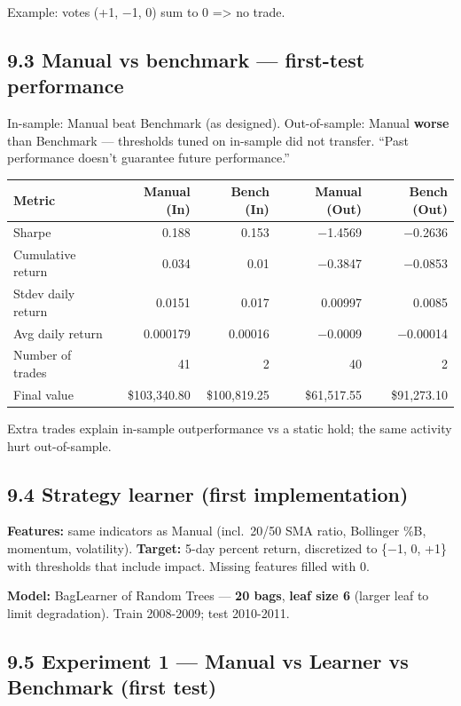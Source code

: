 \documentclass[
  11pt,
]{article}
\begin{document}
Example: votes (+1, −1, 0) sum to 0 =\textgreater{} no trade.

\subsection{9.3 Manual vs benchmark --- first-test
performance}\label{manual-vs-benchmark-first-test-performance}

In-sample: Manual beat Benchmark (as designed). Out-of-sample: Manual
\textbf{worse} than Benchmark --- thresholds tuned on in-sample did not
transfer. ``Past performance doesn't guarantee future performance.''

\begin{longtable}[]{@{}lrrrr@{}}
\toprule\noalign{}
Metric & Manual (In) & Bench (In) & Manual (Out) & Bench (Out) \\
\midrule\noalign{}
\endhead
\bottomrule\noalign{}
\endlastfoot
Sharpe & 0.188 & 0.153 & −1.4569 & −0.2636 \\
Cumulative return & 0.034 & 0.01 & −0.3847 & −0.0853 \\
Stdev daily return & 0.0151 & 0.017 & 0.00997 & 0.0085 \\
Avg daily return & 0.000179 & 0.00016 & −0.0009 & −0.00014 \\
Number of trades & 41 & 2 & 40 & 2 \\
Final value & \$103,340.80 & \$100,819.25 & \$61,517.55 & \$91,273.10 \\
\end{longtable}

Extra trades explain in-sample outperformance vs a static hold; the same
activity hurt out-of-sample.

\subsection{9.4 Strategy learner (first
implementation)}\label{strategy-learner-first-implementation}

\textbf{Features:} same indicators as Manual (incl.~20/50 SMA ratio,
Bollinger \%B, momentum, volatility). \textbf{Target:} 5-day percent
return, discretized to \{−1, 0, +1\} with thresholds that include
impact. Missing features filled with 0.

\textbf{Model:} BagLearner of Random Trees --- \textbf{20 bags},
\textbf{leaf size 6} (larger leaf to limit degradation). Train
2008-2009; test 2010-2011.

\subsection{9.5 Experiment 1 --- Manual vs Learner vs Benchmark (first
test)}\label{experiment-1-manual-vs-learner-vs-benchmark-first-test}
\end{document}
